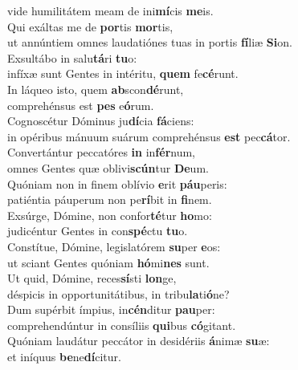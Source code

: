 \oddverse vide humilitátem meam de ini\textbf{mí}cis \textbf{me}is.\\
\evenverse Qui exáltas me de \textbf{por}tis \textbf{mor}tis,~\*\\
\evenverse ut annúntiem omnes laudatiónes tuas in portis \textbf{fí}liæ \textbf{Si}on.\\
\oddverse Exsultábo in salu\textbf{tá}ri \textbf{tu}o:~\*\\
\oddverse infíxæ sunt Gentes in intéritu, \textbf{quem} fe\textbf{cé}runt.\\
\evenverse In láqueo isto, quem \textbf{ab}scon\textbf{dé}runt,~\*\\
\evenverse comprehénsus est \textbf{pes} e\textbf{ó}rum.\\
\oddverse Cognoscétur Dóminus ju\textbf{dí}cia \textbf{fá}ciens:~\*\\
\oddverse in opéribus mánuum suárum comprehénsus \textbf{est} pec\textbf{cá}tor.\\
\evenverse Convertántur peccatóres \textbf{in} in\textbf{fér}num,~\*\\
\evenverse omnes Gentes quæ oblivi\textbf{scún}tur \textbf{De}um.\\
\oddverse Quóniam non in finem oblívio \textbf{e}rit \textbf{páu}peris:~\*\\
\oddverse patiéntia páuperum non pe\textbf{rí}bit in \textbf{fi}nem.\\
\evenverse Exsúrge, Dómine, non confor\textbf{té}tur \textbf{ho}mo:~\*\\
\evenverse judicéntur Gentes in con\textbf{spé}ctu \textbf{tu}o.\\
\oddverse Constítue, Dómine, legislatórem \textbf{su}per \textbf{e}os:~\*\\
\oddverse ut sciant Gentes quóniam \textbf{hó}mi\textbf{nes} sunt.\\
\evenverse Ut quid, Dómine, reces\textbf{sí}sti \textbf{lon}ge,~\*\\
\evenverse déspicis in opportunitátibus, in tribu\textbf{la}ti\textbf{ó}ne?\\
\oddverse Dum supérbit ímpius, in\textbf{cén}ditur \textbf{pau}per:~\*\\
\oddverse comprehendúntur in consíliis \textbf{qui}bus \textbf{có}gitant.\\
\evenverse Quóniam laudátur peccátor in desidériis \textbf{á}nimæ \textbf{su}æ:~\*\\
\evenverse et iníquus \textbf{be}ne\textbf{dí}citur.\\
